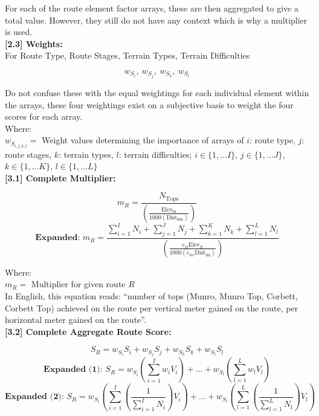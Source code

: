 \documentclass[11pt, english]{article}
\begin{document}
	For each of the route element factor arrays, these are then aggregated to give a total value. However, they still do not have any context which is why a multiplier is used.\\

	\textbf{[2.3] Weights:}\\

	For Route Type, Route Stages, Terrain Types, Terrain Difficulties

	$$w_{S_{i}},\ w_{S_{j}},\ w_{S_{k}},\ w_{S_{l}}$$

	Do not confuse these with the equal weightings for each individual element within the arrays, these four weightings exist on a subjective basis to weight the four scores for each array.\\

	Where:\\
	$w_{S_{i,j,k,l}}=$ Weight values determining the importance of arrays of $i$: route type, $j$: route stages, $k$: terrain types, $l$: terrain difficulties; $i\in\{1,...I\}$, $j\in\{1,...J\}$, $k\in\{1,...K\}$, $l\in\{1,...L\}$\\

	\textbf{[3.1] Complete Multiplier:}

	$$m_{R}=\frac{N_{\mathrm{Tops}}}{\left(\frac{\mathrm{Elev_{m}}}{1000\left(\mathrm{Dist_{km}}\right)}\right)}$$
	$$\textbf{Expanded: }m_{R}=\frac{\sum^{I}_{i=1}N_{i}+\sum^{J}_{j=1}N_{j}+\sum^{K}_{k=1}N_{k}+\sum^{L}_{l=1}N_{l}}{\left(\frac{c_{ft}\mathrm{Elev_{ft}}}{1000\left(c_{mi}\mathrm{Dist_{mi}}\right)}\right)}$$

	Where:\\
	$m_{R}=$ Multiplier for given route $R$\\

	In English, this equation reads: ``number of tops (Munro, Munro Top, Corbett, Corbett Top) achieved on the route per vertical meter gained on the route, per horizontal meter gained on the route''.\\

	\textbf{[3.2] Complete Aggregate Route Score:}

	$$S_{R}=w_{S_{i}}S_{i}+w_{S_{j}}S_{j}+w_{S_{k}}S_{k}+w_{S_{l}}S_{l}$$
	$$\textbf{Expanded (1): }S_{R}=w_{S_{i}}\left(\sum^{I}_{i=1} w_{i}V_{i}\right)+...+w_{S_{l}}\left(\sum^{L}_{l=1} w_{l}V_{l}\right)$$
	$$\textbf{Expanded (2): }S_{R}=w_{S_{i}}\left(\sum^{I}_{i=1} \left(\frac{1}{\sum^{I}_{i=1}N_{i}}\right)V_{i}\right)+...+w_{S_{l}}\left(\sum^{L}_{l=1} \left(\frac{1}{\sum^{L}_{l=1}N_{l}}\right)V_{l}\right)$$
\end{document}

